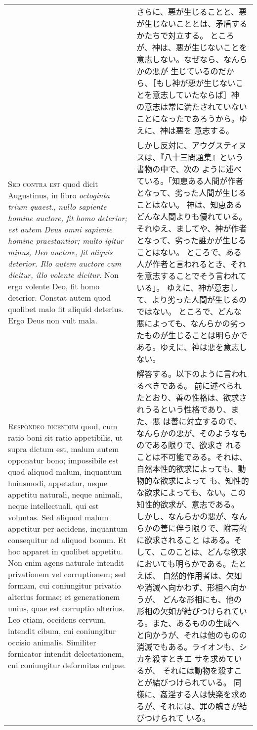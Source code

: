 \documentclass[10pt]{jsarticle} %
\begin{document}
\begin{longtable}{p{21em}p{21em}}
&

さらに、悪が生じることと、悪が生じないこととは、矛盾するかたちで対立する。
 ところが、神は、悪が生じないことを意志しない。なぜなら、なんらかの悪が
 生じているのだから、［もし神が悪が生じないことを意志していたならば］神
 の意志は常に満たされていないことになったであろうから。ゆえに、神は悪を
 意志する。


\\


{\scshape Sed contra est} quod dicit Augustinus, in
libro {\itshape octoginta trium quaest}., {\itshape nullo sapiente homine auctore, fit homo
deterior; est autem Deus omni sapiente homine praestantior; multo igitur
minus, Deo auctore, fit aliquis deterior. Illo autem auctore cum
dicitur, illo volente dicitur}. Non ergo volente Deo, fit homo
deterior. Constat autem quod quolibet malo fit aliquid deterius. Ergo
Deus non vult mala.


&

しかし反対に、アウグスティヌスは、『八十三問題集』という書物の中で、次の
 ように述べている。「知恵ある人間が作者となって、劣った人間が生じることはない。
神は、知恵あるどんな人間よりも優れている。
それゆえ、ましてや、神が作者となって、劣った誰かが生じることはない。
ところで、ある人が作者と言われるとき、それを意志することでそう言われている」。
ゆえに、神が意志して、より劣った人間が生じるのではない。
ところで、どんな悪によっても、なんらかの劣ったものが生じることは明らかで
 ある。ゆえに、神は悪を意志しない。


\\


{\scshape Respondeo dicendum} quod, cum ratio boni sit
ratio appetibilis, ut supra dictum est, malum autem opponatur bono;
impossibile est quod aliquod malum, inquantum huiusmodi, appetatur,
neque appetitu naturali, neque animali, neque intellectuali, qui est
voluntas. Sed aliquod malum appetitur per accidens, inquantum
consequitur ad aliquod bonum. Et hoc apparet in quolibet appetitu. Non
enim agens naturale intendit privationem vel corruptionem; sed formam,
cui coniungitur privatio alterius formae; et generationem unius, quae
est corruptio alterius. Leo etiam, occidens cervum, intendit cibum, cui
coniungitur occisio animalis. Similiter fornicator intendit
delectationem, cui coniungitur deformitas culpae. 


&

解答する。以下のように言われるべきである。
前に述べられたとおり、善の性格は、欲求されうるという性格であり、また、悪
 は善に対立するので、なんらかの悪が、そのようなものである限りで、欲求さ
 れることは不可能である。それは、自然本性的欲求によっても、動物的な欲求によって
 も、知性的な欲求によっても、ない。この知性的欲求が、意志である。
しかし、なんらかの悪が、なんらかの善に伴う限りで、附帯的に欲求されること
 はある。そして、このことは、どんな欲求においても明らかである。たとえば、
 自然的作用者は、欠如や消滅へ向かわず、形相へ向かうが、
 どんな形相にも、他の形相の欠如が結びつけられている。また、あるものの生成へ
 と向かうが、それは他のものの消滅でもある。ライオンも、シカを殺すときエ
 サを求めているが、
それには動物を殺すことが結びつけられている。
 同様に、姦淫する人は快楽を求めるが、それには、罪の醜さが結びつけられて
 いる。



\end{longtable}
\end{document}
